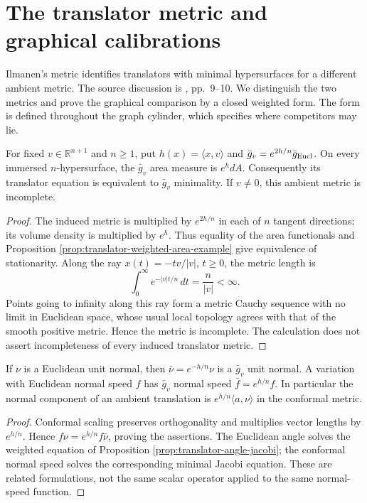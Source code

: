 \chapter{The translator metric and graphical calibrations}\label{sec:translator-metric-calibration}
Ilmanen's metric identifies translators with minimal hypersurfaces for a different ambient metric. The source discussion is \cite{HIMW19}, pp.~9--10. We distinguish the two metrics and prove the graphical comparison by a closed weighted form. The form is defined throughout the graph cylinder, which specifies where competitors may lie.

\begin{proposition}\label{prop:translator-conformal-metric}
For fixed $v\in\mathbb R^{n+1}$ and $n\ge1$, put $h(x)=\langle x,v\rangle$ and $\bar g_v=e^{2h/n}\bar g_{\rm Eucl}$. On every immersed $n$-hypersurface, the $\bar g_v$ area measure is $e^h dA$. Consequently its translator equation is equivalent to $\bar g_v$ minimality. If $v\ne0$, this ambient metric is incomplete.
\end{proposition}
\begin{proof}
The induced metric is multiplied by $e^{2h/n}$ in each of $n$ tangent directions; its volume density is multiplied by $e^h$. Thus equality of the area functionals and Proposition \ref{prop:translator-weighted-area-example} give equivalence of stationarity. Along the ray $x(t)=-tv/|v|$, $t\ge0$, the metric length is
\[
 \int_0^\infty e^{-|v|t/n}\,dt=\frac n{|v|}<\infty.
\]
Points going to infinity along this ray form a metric Cauchy sequence with no limit in Euclidean space, whose usual local topology agrees with that of the smooth positive metric. Hence the metric is incomplete. The calculation does not assert incompleteness of every induced translator metric.
\end{proof}

\begin{proposition}\label{prop:translator-metric-normal-speed}
If $\nu$ is a Euclidean unit normal, then $\bar\nu=e^{-h/n}\nu$ is a $\bar g_v$ unit normal. A variation with Euclidean normal speed $f$ has $\bar g_v$ normal speed $\bar f=e^{h/n}f$. In particular the normal component of an ambient translation is $e^{h/n}\langle a,\nu\rangle$ in the conformal metric.
\end{proposition}
\begin{proof}
Conformal scaling preserves orthogonality and multiplies vector lengths by $e^{h/n}$. Hence $f\nu=e^{h/n}f\bar\nu$, proving the assertions. The Euclidean angle solves the weighted equation of Proposition \ref{prop:translator-angle-jacobi}; the conformal normal speed solves the corresponding minimal Jacobi equation. These are related formulations, not the same scalar operator applied to the same normal-speed function.
\end{proof}

